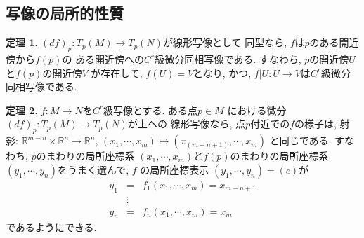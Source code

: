 \documentclass[a4j,12pt]{jarticle}
\theoremstyle{definition}
\newtheorem{theorem}{定理}[section]
\begin{document}
\subsection{写像の局所的性質}
\begin{theorem}\label{theo:f^(-1)theorem}
    $(df)_p:T_p(M)\to T_p(N)$が線形写像として
    同型なら, $f$は$p$のある開近傍から$f(p)$の
    ある開近傍への$C^r$級微分同相写像である. 
    すなわち, $p$の開近傍$U$と$f(p)$の開近傍$V$
    が存在して, $f(U)=V$となり, かつ, 
    $f|U:U \to V$は$C^r$級微分同相写像である. 
\end{theorem}
\begin{theorem}\label{theo: projection theorem}
    $f:M\to N$を$C^r$級写像とする. ある点$p\in M$
    における微分$(df)_p:T_p(M)\to T_p(N)$が上への
    線形写像なら, 点$p$付近での$f$の様子は, 射影:
    $\mathbb{R}^{m-n} \times \mathbb{R}^n \to \mathbb{R}^n$, 
    $(x_1, \cdots ,x_m)\mapsto (x_(m-n+1), \cdots ,x_m)$
    と同じである. すなわち, $p$のまわりの局所座標系
    $(x_1,\cdots ,x_m)$と$f(p)$のまわりの局所座標系
    $(y_1, \cdots ,y_n)$をうまく選んで, $f$
    の局所座標表示
    $(y_1, \cdots ,y_n)=(c)$が
    \begin{eqnarray*}
        y_1&=&f_1(x_1,\cdots ,x_m)=x_{m-n+1}\\
        &\vdots& \\
        y_n&=&f_n(x_1,\cdots ,x_m)=x_m
    \end{eqnarray*}
    であるようにできる. 
\end{theorem}
\end{document}
